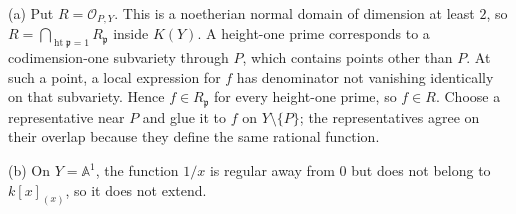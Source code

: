 (a) Put $R=\mathcal O_{P,Y}$. This is a noetherian normal domain of dimension at least $2$, so $R=\bigcap_{\operatorname{ht}\mathfrak p=1}R_{\mathfrak p}$ inside $K(Y)$. A height-one prime corresponds to a codimension-one subvariety through $P$, which contains points other than $P$. At such a point, a local expression for $f$ has denominator not vanishing identically on that subvariety. Hence $f\in R_{\mathfrak p}$ for every height-one prime, so $f\in R$. Choose a representative near $P$ and glue it to $f$ on $Y\setminus\{P\}$; the representatives agree on their overlap because they define the same rational function.

(b) On $Y=\mathbb A^1$, the function $1/x$ is regular away from $0$ but does not belong to $k[x]_{(x)}$, so it does not extend.
